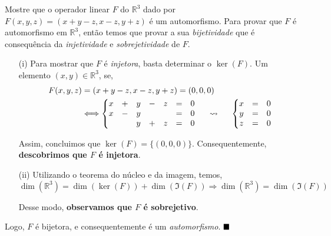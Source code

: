\begin{solutionitem}[a]{Mostre que o operador linear $F$ do $\mathbb{R}^3$ dado por $F(x, y, z) = (x + y - z, x - z, y + z)$ é um automorfismo.}
    Para provar que $F$ é automorfismo em $\mathbb{R}^3$, então temos que provar a sua \textit{bijetividade} que é consequência da \textit{injetividade} e \textit{sobrejetividade} de $F$.
        \begin{enumerate}
            \item[(i)] Para mostrar que $F$ é \textit{injetora}, basta determinar o $\ker(F)$. Um elemento $(x,y) \in \mathbb{R}^3$, se,
            \begin{align*}
                F(x, y, z) &= (x + y - z, x - z, y + z) = (0, 0, 0) \\
                &\Longleftrightarrow 
            \left\{
                \begin{matrix}
                    x & + & y & - & z & = & 0 \\
                    x & - & y &   &   & = & 0 \\
                      &   & y & + & z & = & 0 \\
                \end{matrix}
            \right.
            \hspace{0.5cm}\rightsquigarrow\hspace{0.5cm}
            \left\{
                \begin{matrix}
                    x & = & 0 \\
                    y & = & 0 \\
                    z & = & 0 \\
                \end{matrix}
            \right.
            \end{align*}

            Assim, concluimos que $\ker(F) = \{(0, 0, 0)\}$. Consequentemente, \textbf{descobrimos que $F$ é injetora}.

        \item[(ii)] Utilizando o teorema do núcleo e da imagem, temos,
        \[ 
        \dim(\mathbb{R}^3) = \dim(\ker(F)) + \dim(\Im(F)) \Longrightarrow \dim(\mathbb{R}^3) = \dim(\Im(F))
        \]

        Desse modo, \textbf{observamos que $F$ é sobrejetivo}.
        \end{enumerate}
        Logo, $F$ é bijetora, e consequentemente é um \textit{automorfismo}. $\hfill{\blacksquare}$
\end{solutionitem}

\begin{solutionitem}[b]{\lipsum[5-5]}
    \lipsum[5-6]
\end{solutionitem}